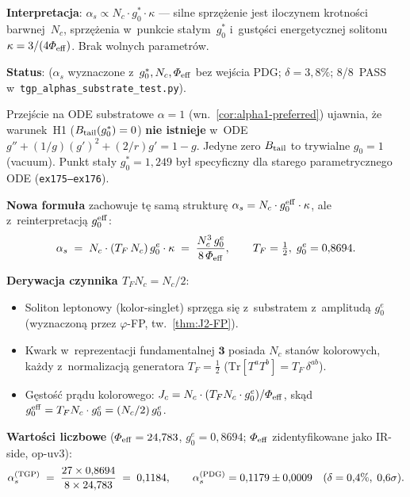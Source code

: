 \begin{proposition}
\textbf{Interpretacja}: $\alpha_s \propto N_c \cdot g_0^* \cdot \kappa$
--- silne sprz\k{e}\.zenie jest iloczynem krotno\'sci barwnej~$N_c$,
sprz\k{e}\.zenia w~punkcie sta\l{}ym~$g_0^*$ i~gust\k{o}\'sci
energetycznej solitonu~$\kappa = 3/(4\Phi_{\rm eff})$. Brak wolnych parametr\'ow.

\textbf{Status}: 
($\alpha_s$ wyznaczone z~$g_0^*, N_c, \Phi_{\rm eff}$ bez wej\'scia PDG;
$\delta = 3{,}8\%$;
8/8~PASS w~\texttt{tgp\_alphas\_substrate\_test.py}).
\end{proposition}

\begin{remark}[Aktualizacja: nowa formu\l{}a $\alpha_s$ z~ODE substratowym
$\alpha = 1$ (sesja~v45)]%
\label{rem:V-alphas-alpha1}
Przej\'scie na ODE substratowe $\alpha = 1$
(wn.~\ref{cor:alpha1-preferred}) ujawnia, \.ze warunek~H1
($B_{\rm tail}(g_0^*) = 0$) \textbf{nie istnieje} w~ODE
$g'' + (1/g)(g')^2 + (2/r)g' = 1-g$.
Jedyne zero $B_{\rm tail}$ to trywialne $g_0 = 1$ (vacuum).
Punkt sta\l{}y $g_0^* = 1{,}249$ by\l{} specyficzny dla starego
parametrycznego ODE (\texttt{ex175--ex176}).

\textbf{Nowa formu\l{}a} zachowuje t\k{e} sam\k{a} struktur\k{e}
$\alpha_s = N_c \cdot g_0^{\rm eff} \cdot \kappa$,
ale z~reinterpretacj\k{a} $g_0^{\rm eff}$:
\begin{equation}\label{eq:V-alphas-new}
  \alpha_s
  \;=\;
  N_c \cdot (T_F\,N_c)\,g_0^e \cdot \kappa
  \;=\;
  \frac{N_c^3\,g_0^e}{8\,\Phi_{\rm eff}},
  \qquad
  T_F = \tfrac{1}{2},\; g_0^e = 0{,}8694.
\end{equation}

\textbf{Derywacja czynnika $T_F N_c = N_c/2$}:
\begin{itemize}[nosep]
  \item Soliton leptonowy (kolor-singlet) sprz\k{e}ga si\k{e}
    z~substratem z~amplitud\k{a} $g_0^e$ (wyznaczon\k{a} przez
    $\varphi$-FP, tw.~\ref{thm:J2-FP}).
  \item Kwark w~reprezentacji fundamentalnej $\mathbf{3}$ posiada
    $N_c$ stan\'ow kolorowych, ka\.zdy z~normalizacj\k{a} generatora
    $T_F = \tfrac{1}{2}$ ($\mathrm{Tr}[T^a T^b] = T_F\,\delta^{ab}$).
  \item G\k{e}sto\'s\'c pr\k{a}du kolorowego: $J_c = N_c \cdot
    (T_F N_c \cdot g_0^e)/\Phi_{\rm eff}$, sk\k{a}d
    $g_0^{\rm eff} = T_F N_c \cdot g_0^e = (N_c/2)\,g_0^e$.
\end{itemize}

\textbf{Warto\'sci liczbowe} ($\Phi_{\rm eff} = 24{,}783$, $g_0^e = 0{,}8694$;
$\Phi_{\rm eff}$ zidentyfikowane jako IR-side, op-uv3):
\[
  \alpha_s^{\rm (TGP)}
  \;=\; \frac{27 \times 0{,}8694}{8 \times 24{,}783}
  \;=\; 0{,}1184,
  \qquad
  \alpha_s^{\rm (PDG)} = 0{,}1179 \pm 0{,}0009
  \quad (\delta = 0{,}4\%,\; 0{,}6\sigma).
\]


\end{remark}
